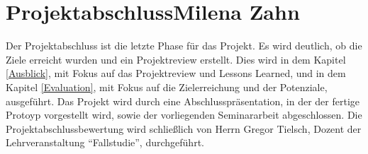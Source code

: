 	\section[Projektabschluss]{Projektabschluss{\hfill \normalsize Milena Zahn}} 
	Der Projektabschluss ist die letzte Phase für das Projekt. Es wird deutlich, ob die Ziele erreicht wurden und ein Projektreview erstellt. Dies wird in dem Kapitel \vref{Ausblick}, mit Fokus auf das Projektreview und Lessons Learned, und in dem Kapitel \vref{Evaluation}, mit Fokus auf die Zielerreichung und der Potenziale, ausgeführt. Das Projekt wird durch eine Abschlusspräsentation, in der der fertige Protoyp vorgestellt wird, sowie der vorliegenden Seminararbeit abgeschlossen. Die Projektabschlussbewertung wird schließlich von Herrn Gregor Tielsch, Dozent der Lehrveranstaltung \enquote{Fallstudie}, durchgeführt.